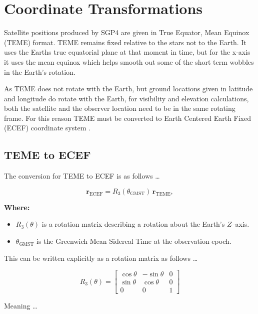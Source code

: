 \section{Coordinate Transformations} \label{section:mathematical_coordinate_transformation}
Satellite positions produced by SGP4 are given in True Equator, Mean Equinox (TEME) format. TEME remains fixed relative to the stars not to the Earth. It uses the Earths true equatorial plane at that moment in time, but for the x-axis it uses the mean equinox which helps smooth out some of the short term wobbles in the Earth's rotation.  

As TEME does not rotate with the Earth, but ground locations given in latitude and longitude do rotate with the Earth, for visibility and elevation calculations, both the satellite and the observer location need to be in the same rotating frame. For this reason TEME must be converted to Earth Centered Earth Fixed (ECEF) coordinate system \cite{inproceedings}. 
 
\subsection{TEME to ECEF}
The conversion for TEME to ECEF is as follows \ldots

\begin{equation}
    \mathbf{r}_{\text{ECEF}} = R_{3}\!\left(\theta_{\text{GMST}}\right)\,\mathbf{r}_{\text{TEME}},
\end{equation}

\noindent\textbf{Where:}
\begin{itemize}
    \item $R_{3}(\theta)$ is a rotation matrix describing a rotation about the Earth's $Z$--axis.
    \item $\theta_{\text{GMST}}$ is the Greenwich Mean Sidereal Time at the observation epoch.
\end{itemize}

This can be written explicitly as a rotation matrix as follows \ldots

\begin{equation}
R_{3}(\theta) = 
\begin{bmatrix}
\cos\theta & -\sin\theta & 0 \\
\sin\theta &  \cos\theta & 0 \\
0          &  0          & 1
\end{bmatrix}
\end{equation}

Meaning \ldots

